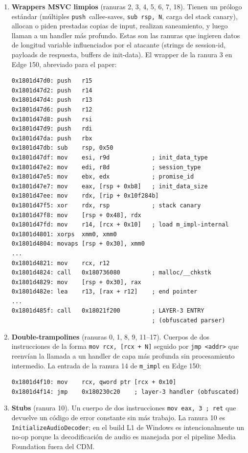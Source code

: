 \documentclass[11pt,letterpaper]{article}
\begin{document}
\begin{enumerate}[itemsep=2pt,topsep=2pt]
  \item \textbf{Wrappers MSVC limpios} (ranuras 2, 3, 4, 5, 6, 7,
        18). Tienen un prólogo estándar (múltiples
        \texttt{push}~callee-saves, \texttt{sub rsp, N}, carga del
        stack canary), allocan o piden prestadas copias de input,
        realizan saneamiento, y luego llaman a un handler más
        profundo. Estas son las ranuras que ingieren datos de
        longitud variable influenciados por el atacante (strings
        de session-id, payloads de respuesta, buffers de
        init-data). El wrapper de la ranura 3 en Edge 150,
        abreviado para el paper:

\begin{lstlisting}[basicstyle=\ttfamily\scriptsize]
0x1801d47d0: push   r15
0x1801d47d2: push   r14
0x1801d47d4: push   r13
0x1801d47d6: push   r12
0x1801d47d8: push   rsi
0x1801d47d9: push   rdi
0x1801d47da: push   rbx
0x1801d47db: sub    rsp, 0x50
0x1801d47df: mov    esi, r9d            ; init_data_type
0x1801d47e2: mov    edi, r8d            ; session_type
0x1801d47e5: mov    ebx, edx            ; promise_id
0x1801d47e7: mov    eax, [rsp + 0xb8]   ; init_data_size
0x1801d47ee: mov    rdx, [rip + 0x10f284b]
0x1801d47f5: xor    rdx, rsp            ; stack canary
0x1801d47f8: mov    [rsp + 0x48], rdx
0x1801d47fd: mov    r14, [rcx + 0x10]   ; load m_impl-internal
0x1801d4801: xorps  xmm0, xmm0
0x1801d4804: movaps [rsp + 0x30], xmm0
...
0x1801d4821: mov    rcx, r12
0x1801d4824: call   0x180736080         ; malloc/__chkstk
0x1801d4829: mov    [rsp + 0x30], rax
0x1801d482e: lea    r13, [rax + r12]    ; end pointer
...
0x1801d485f: call   0x18021f200         ; LAYER-3 ENTRY
                                        ; (obfuscated parser)
\end{lstlisting}

  \item \textbf{Double-trampolines} (ranuras 0, 1, 8, 9, 11--17).
        Cuerpos de dos instrucciones de la forma
        \texttt{mov rcx, [rcx + N]} seguido por \texttt{jmp <addr>}
        que reenvían la llamada a un handler de capa más profunda
        sin procesamiento intermedio. La entrada de la ranura 14
        de \texttt{m\_impl} en Edge 150:

\begin{lstlisting}[basicstyle=\ttfamily\scriptsize]
0x1801d4f10: mov    rcx, qword ptr [rcx + 0x10]
0x1801d4f14: jmp    0x180230c20    ; layer-3 handler (obfuscated)
\end{lstlisting}

  \item \textbf{Stubs} (ranura 10). Un cuerpo de dos instrucciones
        \texttt{mov eax, 3 ; ret} que devuelve un código de error
        constante sin más trabajo. La ranura 10 es
        \texttt{InitializeAudioDecoder}; en el build L1 de Windows
        es intencionalmente un no-op porque la decodificación de
        audio es manejada por el pipeline Media Foundation fuera
        del CDM.
\end{enumerate}
\end{document}
